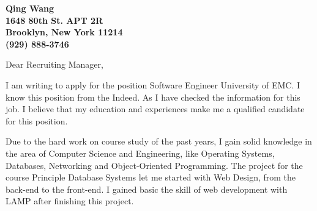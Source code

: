 \documentclass[11pt]{letter} %
\begin{document}

\begin{letter}{}


\begin{center}
\large\bf Qing Wang \\ %
1648 80th St. APT 2R \\ Brooklyn, New York 11214 \\ (929) 888-3746 %
\end{center} 
\vfill

\signature{Qing Wang} %


\opening{Dear Recruiting Manager,} 
 
I am writing to apply for the position Software Engineer University of EMC. I know this position from the Indeed. As I have checked the information for this job. I believe that my education and experiences make me a qualified candidate for this position.

Due to the hard work on course study of the past years, I gain solid knowledge in the area of Computer Science and Engineering, like Operating Systems, Databases, Networking and Object-Oriented Programming. The project for the course Principle Database Systems let me started with Web Design, from the back-end to the front-end. I gained basic the skill of web development with LAMP after finishing this project.


\end{letter}
\end{document}
